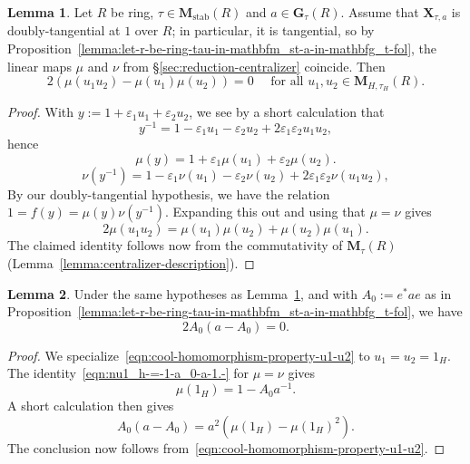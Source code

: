 \documentclass[reqno]{amsart}
\def\eps{\varepsilon}
\DeclareMathOperator{\stab}{stab}
\theoremstyle{plain} \newtheorem{theorem} {Theorem} \newtheorem{conjecture} {Conjecture} \newtheorem{corollary} [theorem] {Corollary} \newtheorem{proposition} [theorem] {Proposition} \newtheorem{fact} [theorem] {Fact}
\theoremstyle{definition} \newtheorem{definition} [theorem] {Definition}
\theoremstyle{itplain} %
\newtheorem{lemma}[theorem]{Lemma}
\begin{document}
\begin{lemma}\label{lemma:second-derivatives-yield-homomorphism-property}
  Let $R$ be ring, $\tau \in \mathbf{M}_{\stab}(R)$ and $a \in \mathbf{G}_{\tau}(R)$.  Assume that $\mathbf{X}_{\tau,a}$ is doubly-tangential at $1$ over $R$; in particular, it is tangential, so by Proposition~\ref{lemma:let-r-be-ring-tau-in-mathbfm_st-a-in-mathbfg_t-fol}, the linear maps $\mu$ and $\nu$ from \S\ref{sec:reduction-centralizer} coincide.  Then
  \begin{equation}\label{eqn:cool-homomorphism-property-u1-u2}
    2 \left( \mu (u _1 u _2 ) - \mu (u _1 ) \mu (u _2 ) \right) = 0
    \quad
    \text{ for all } u_1, u_2 \in \mathbf{M}_{H,\tau_H}(R).
  \end{equation}
\end{lemma}
\begin{proof}
  With $y := 1 + \eps_1 u_1 + \eps_2 u_2$, we see by a short calculation that
  \begin{equation*}
    y^{-1} = 1 - \eps_1 u_1 - \eps_2 u_2 + 2 \eps_1 \eps_2 u_1 u_2,
  \end{equation*}
  hence
  \begin{equation*}
    \mu (y) = 1 + \eps _1 \mu (u _1 ) + \eps _2  \mu (u _2 ).
  \end{equation*}
  \begin{equation*}
    \nu(y^{-1})
    = 1 - \eps _1  \nu(u _1 )
    - \eps _2 \nu (u _2 ) + 2 \eps _1 \eps _2 \nu (u _1 u _2 ),
  \end{equation*}
  By our doubly-tangential hypothesis, we have the relation $1 = f(y) = \mu(y) \nu(y^{-1})$.  Expanding this out and using that $\mu = \nu$ gives
  \begin{equation*}
    2 \mu (u _1 u _2 )
    =
    \mu  (u _1 ) \mu  (u _2 )
    +
    \mu (u _2 ) \mu (u _1 ).
  \end{equation*}
  The claimed identity follows now from the commutativity of $\mathbf{M}_\tau(R)$ (Lemma~\ref{lemma:centralizer-description}).
\end{proof}
\begin{lemma}\label{lemma:A0-times-a-minus-A0-vanishes}
  Under the same hypotheses as Lemma~\ref{lemma:second-derivatives-yield-homomorphism-property}, and with $A_0 := e^* a e$ as in Proposition~\ref{lemma:let-r-be-ring-tau-in-mathbfm_st-a-in-mathbfg_t-fol}, we have
  \begin{equation}\label{eqn:2-a_0--a_0-=-0.-}
    2 A_0 ( a - A_0) = 0.
  \end{equation}
\end{lemma}
\begin{proof}
  We specialize~\eqref{eqn:cool-homomorphism-property-u1-u2} to $u_1 = u_2 = 1_H$.  The identity~\eqref{eqn:nu1_h-=-1-a_0-a-1.-} for $\mu = \nu$ gives
  \begin{equation*}
    \mu(1_H) = 1 - A_0 a^{-1}.
  \end{equation*}
  A short calculation then gives
  \begin{equation*}
    A_0(a - A_0) = a^2 (\mu(1_H) - {\mu(1_H)}^2).
  \end{equation*}
  The conclusion now follows from~\eqref{eqn:cool-homomorphism-property-u1-u2}.
\end{proof}
\end{document}
